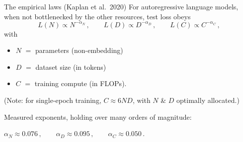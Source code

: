 \documentclass[11pt]{beamer}
\newcommand{\hl}[1]{{\color{blue!60!black}\textbf{#1}}}
\begin{document}
\begin{frame}{The empirical laws (Kaplan et al.\ 2020)}
  For autoregressive language models, when not bottlenecked by the other
  resources, test loss obeys
  \[
    L(N) \propto N^{-\alpha_N}\,,\qquad
    L(D) \propto D^{-\alpha_D}\,,\qquad
    L(C) \propto C^{-\alpha_C}\,,
  \]
  with
  \begin{itemize}
  \item \hl{$N$} $=$ parameters (non-embedding)
  \item \hl{$D$} $=$ dataset size (in tokens)
  \item $C$ $=$ training compute (in FLOPs).
  \end{itemize}
  (Note: for single-epoch training, $C\approx 6ND$, with $N$ \& $D$ optimally allocated.)
  
  \medskip
  Measured exponents, holding over many orders of magnitude:
  \begin{center}
    $\alpha_N \approx 0.076\,,\qquad
    \alpha_D \approx 0.095\,,\qquad
    \alpha_C \approx 0.050\,.$
  \end{center}
\end{frame}
\end{document}
